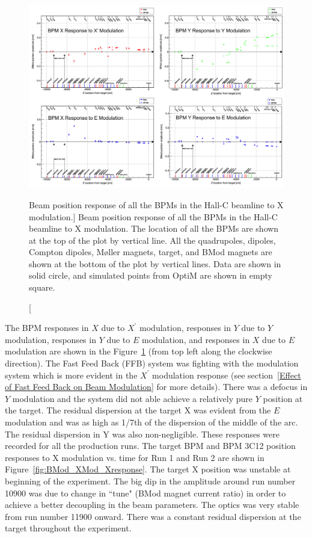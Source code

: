 \begin{singlespace}
\begin{figure}[!h]
	\begin{center}
	\includegraphics[width=15.0cm]{figures/BModOpticsMISC}
	\end{center}
	\caption
	[Beam position response of all the BPMs in the Hall-C beamline to X modulation.]
	{Beam position response of all the BPMs in the Hall-C beamline to X modulation. The location of all the BPMs are shown at the top of the plot by vertical line. All the quadrupoles, dipoles, Compton dipoles, M{\o}ller magnets, target, and BMod magnets are shown at the bottom of the plot by vertical lines. Data are shown in solid circle, and simulated points from OptiM are shown in empty square.}
	\label{fig:BModOpticsMISC}
\end{figure}
\end{singlespace}


The BPM responses in $X$ due to $X^{\prime}$ modulation, responses in $Y$ due to $Y$ modulation, responses in $Y$ due to $E$ modulation, and responses in $X$ due to $E$ modulation are shown in the Figure~\ref{fig:BModOpticsMISC} (from top left along the clockwise direction). 
The Fast Feed Back (FFB) system was fighting with the modulation system which is more evident in the $X^{\prime}$ modulation response (see section~\ref{Effect of Fast Feed Back on Beam Modulation} for more details). There was a defocus in $Y$ modulation and the system did not able achieve a relatively pure $Y$ position at the target. The residual dispersion at the target X was evident from the $E$ modulation and was as high as 1/7th of the dispersion of the middle of the arc. The residual dispersion in Y was also non-negligible.
These responses were recorded for all the production runs. The target BPM and BPM 3C12 position responses to X modulation vs. time for Run 1 and Run 2 are shown in Figure~\ref{fig:BMod_XMod_Xresponse}. The target X position was unstable at beginning of the experiment. The big dip in the amplitude around run number 10900 was due to change in ``tune" (BMod magnet current ratio) in order to achieve a better decoupling in the beam parameters. The optics was very stable from run number 11900 onward. There was a constant residual dispersion at the target throughout the experiment.



